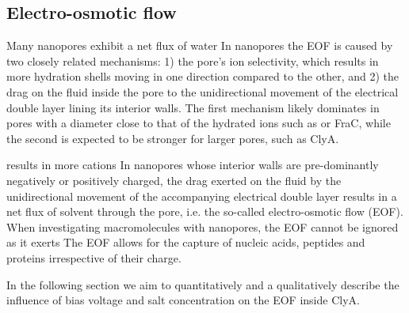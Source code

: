 \documentclass[journal=ancac3,manuscript=article,etalmode=truncate,maxauthors=0,layout=twocolumn]{achemso}
\begin{document}


%

\subsection{Electro-osmotic flow}\label{sec:eof}



Many nanopores exhibit a net flux of water
In nanopores the EOF is caused by two closely related mechanisms: 1) the pore's ion selectivity, which results in more hydration shells moving in one direction compared to the other, and 2) the drag on the fluid inside the pore to the unidirectional movement of the electrical double layer lining its interior walls. The first mechanism likely dominates in pores with a diameter close to that of the hydrated ions such as \ahl\cite{} or FraC,\cite{Huang-2017} while the second is expected to be stronger for larger pores, such as ClyA.


results in more cations
In nanopores whose interior walls are pre-dominantly negatively or positively charged, the drag exerted on the fluid by the unidirectional movement of the accompanying electrical double layer results in a net flux of solvent through the pore, i.e. the so-called electro-osmotic flow (EOF). When investigating macromolecules with nanopores, the EOF cannot be ignored as it exerts The EOF allows for the capture of nucleic acids\cite{Wong-2007}, peptides\cite{Huang-2017} and proteins \cite{Soskine-2012,Soskine-2013,VanMeervelt-2014,Soskine-Biesemans-2015,Biesemans-Soskine-2015,Wloka-2017} irrespective of their charge.


In the following section we aim to quantitatively and a qualitatively describe
the influence of bias voltage and salt concentration on the EOF inside ClyA.
\end{document}
